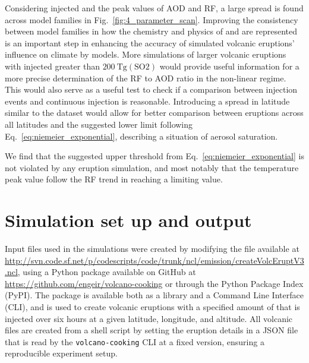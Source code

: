 \documentclass[draft]{agujournal2019}
\newcommand{\iso}[1][i]{{#1}njected \ce{SO2}}
\begin{document}
Considering \iso{} and the peak values of AOD and RF, a large spread is found across
model families in Fig.~\ref{fig:4_parameter_scan}. Improving the consistency between
model families in how the chemistry and physics of  and  are
represented is an important step in enhancing the accuracy of simulated volcanic
eruptions' influence on climate by models. More simulations of larger volcanic eruptions
with \iso{} greater than \(\SI{200}{\tera\gram(\mathrm{SO2})}\) would provide useful
information for a more precise determination of the RF to AOD ratio in the non-linear
regime. This would also serve as a useful test to check if a comparison between 
injection events and continuous  injection is reasonable. Introducing a spread
in latitude similar to the  dataset would allow for better
comparison between eruptions across all latitudes and the suggested lower limit
following Eq.~\ref{eq:niemeier_exponential}, describing a situation of aerosol
saturation.

We find that the suggested upper threshold from Eq.~\ref{eq:niemeier_exponential} is not
violated by any eruption simulation, and most notably that the temperature peak value
follow the RF trend in reaching a limiting value.


%
%
%
%
\appendix
\section{Simulation set up and output}

Input files used in the simulations were created by modifying the file available at
\url{http://svn.code.sf.net/p/codescripts/code/trunk/ncl/emission/createVolcEruptV3.ncl},
using a Python package available on GitHub at
\url{https://github.com/engeir/volcano-cooking} or through the Python Package Index
(PyPI). The package is available both as a library and a Command Line Interface (CLI),
and is used to create volcanic eruptions with a specified amount of  that is
injected over six hours at a given latitude, longitude, and altitude. All volcanic
 files are created from a shell script by setting the eruption details in a JSON
file that is read by the \texttt{volcano-cooking} CLI at a fixed version, ensuring a
reproducible experiment setup.
\end{document}
